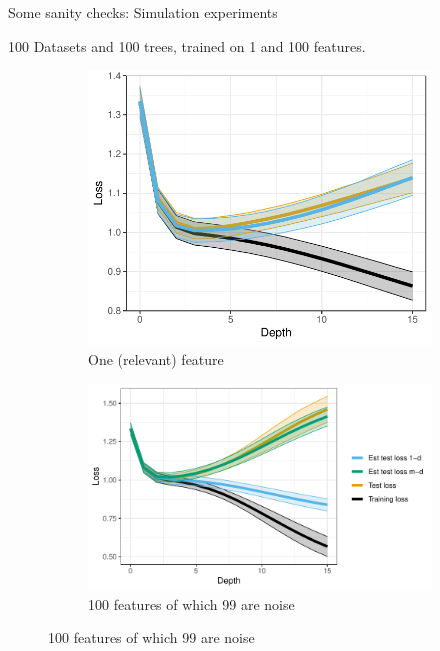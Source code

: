 \begin{frame}{Some sanity checks: Simulation experiments}
	
	100 Datasets and 100 trees, trained on 1 and 100 features.
		\begin{figure}[h]
		\centering
		\begin{subfigure}{.43\textwidth}
			\centering
			\includegraphics[scale=0.4]{figures/loss_vs_depth_one_feature.pdf}
			\caption[]{One (relevant) feature}
			\label{fig: loss vs tree depth one feature}
		\end{subfigure}
		\begin{subfigure}{.53\textwidth}
			\centering
			\includegraphics[scale=0.4]{figures/loss_vs_depth_dim_correct.pdf} 
			\caption[]{100 features of which 99 are noise}
			\label{fig: loss vs tree depth multiple feature}
		\end{subfigure}

\end{figure}
\end{frame}
